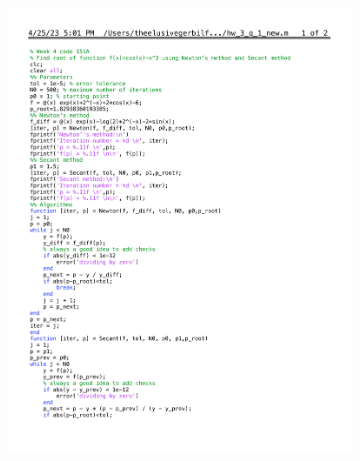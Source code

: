 \documentclass[12pt]{article}
\begin{document}
\begin{enumerate}[label=\bfseries Problem \arabic*:]
\begin{figure}[H]
\begin{subfigure}[t!]{.5\textwidth}
  \includegraphics[clip, trim=0 20cm 0 2.6cm, page=2, width=\linewidth]{Newton_hw_3_q_1_new.pdf}
  \end{subfigure}%
  \begin{subfigure}[t!]{.5\textwidth}

\end{subfigure}
\end{figure}
\end{enumerate}
\end{document}
